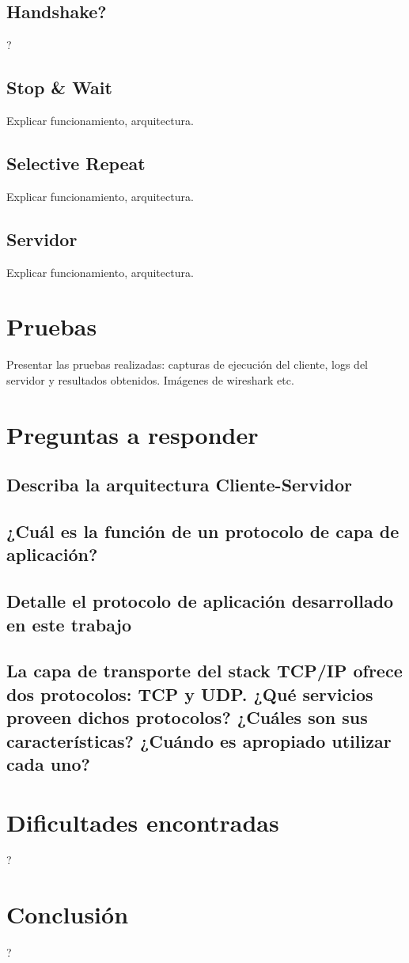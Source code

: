 \documentclass[a4paper,10pt]{article}
\begin{document}
\subsection{Handshake?}
?

\subsection{Stop \& Wait}
Explicar funcionamiento, arquitectura.

\subsection{Selective Repeat}
Explicar funcionamiento, arquitectura.

\subsection{Servidor}
Explicar funcionamiento, arquitectura.

\section{Pruebas}
Presentar las pruebas realizadas: capturas de ejecución del cliente, logs del servidor y resultados obtenidos. Imágenes de wireshark etc.

\section{Preguntas a responder}
\subsection{Describa la arquitectura Cliente-Servidor}
\subsection{¿Cuál es la función de un protocolo de capa de aplicación?}
\subsection{Detalle el protocolo de aplicación desarrollado en este trabajo}
\subsection{La capa de transporte del stack TCP/IP ofrece dos protocolos: TCP y UDP. ¿Qué servicios proveen dichos protocolos? ¿Cuáles son sus características? ¿Cuándo es apropiado utilizar cada uno?}


\section{Dificultades encontradas}
?

\section{Conclusión}
?
\end{document}
